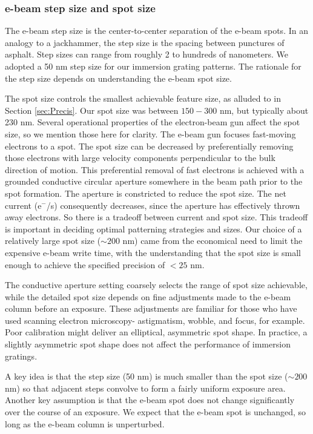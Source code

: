 \documentclass[]{spie}  %
\begin{document}
\subsubsection{e-beam step size and spot size}
The e-beam step size is the center-to-center separation of the e-beam spots.  In an analogy to a jackhammer, the step size is the spacing between punctures of asphalt.  Step sizes can range from roughly 2 to hundreds of nanometers.  We adopted a 50 nm step size for our immersion grating patterns.  The rationale for the step size depends on understanding the e-beam spot size.  

The spot size controls the smallest achievable feature size, as alluded to in Section \ref{sec:Precis}.  Our spot size was between $150-300$ nm, but typically about 230 nm.  Several operational properties of the electron-beam gun affect the spot size, so we mention those here for clarity.  The e-beam gun focuses fast-moving electrons to a spot.  The spot size can be decreased by preferentially removing those electrons with large velocity components perpendicular to the bulk direction of motion.  This preferential removal of fast electrons is achieved with a grounded conductive circular aperture somewhere in the beam path prior to the spot formation.  The aperture is constricted to reduce the spot size.  The net current (e$^-$/s) consequently decreases, since the aperture has effectively thrown away electrons.  So there is a tradeoff between current and spot size.  This tradeoff is important in deciding optimal patterning strategies and sizes.  Our choice of a relatively large spot size ($\sim 200$ nm) came from the economical need to limit the expensive e-beam write time, with the understanding that the spot size is small enough to achieve the specified precision of $< 25$ nm.

The conductive aperture setting coarsely selects the range of spot size achievable, while the detailed spot size depends on fine adjustments made to the e-beam column before an exposure.  These adjustments are familiar for those who have used scanning electron microscopy- astigmatism, wobble, and focus, for example.  Poor calibration might deliver an elliptical, asymmetric spot shape.  In practice, a slightly asymmetric spot shape does not affect the performance of immersion gratings.

A key idea is that the step size (50 nm) is much smaller than the spot size ($\sim200$ nm) so that adjacent steps convolve to form a fairly uniform exposure area.  Another key assumption is that the e-beam spot does not change significantly over the course of an exposure.  We expect that the e-beam spot is unchanged, so long as the e-beam column is unperturbed.
\end{document}
